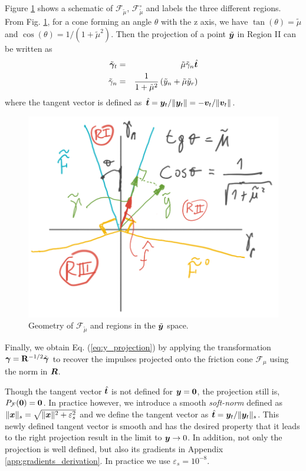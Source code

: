 Figure \ref{fig:cone_regions} shows a schematic of
$\mathcal{F}_{\tilde\mu}$, $\mathcal{F}_{\tilde\mu}^\circ$ and labels the three
different regions. From Fig. \ref{fig:cone_regions}, for a cone forming an angle
$\theta$ with the z axis, we have $\tan(\theta)=\tilde\mu$ and
$\cos(\theta)=1/(1+\tilde\mu^2)$. Then the projection of a point
$\tilde{{\bm{y}}}$ in Region II can be written as
\begin{eqnarray}
	\tilde{{\bm\gamma}}_t &=& \tilde{\mu}\tilde{\gamma}_n\hat{{\bm{t}}}\nonumber\\
	\tilde{\gamma}_n &=& \frac{1}{1+\tilde{\mu}^2}\left(\tilde{y}_n +
	\tilde{\mu}\tilde{y}_r\right)\nonumber		
\end{eqnarray}
where the tangent vector is defined as
$\hat{{\bm{t}}}={\bm{y}}_t/\Vert{\bm{y}}_t\Vert=-{\bm{v}}_t/\Vert{\bm{v}}_t\Vert$. 
\begin{figure}[!h]
    \centering
    \includegraphics[width=0.45\columnwidth]{figures/cone_regions.png}
    \caption{Geometry of $\mathcal{F}_{\tilde\mu}$ and regions in the
    $\tilde{{\bm{y}}}$ space.}
    \label{fig:cone_regions}
\end{figure}

Finally, we obtain Eq. (\ref{eq:y_projection}) by applying the transformation
${\bm\gamma}={\mathbf{R}}^{-1/2}\tilde{{\bm\gamma}}$ to recover the impulses projected onto the
friction cone ${\mathcal{F}}_{\mu}$ using the norm in ${\bm{R}}$.

Though the tangent vector $\hat{{\bm{t}}}$ is not defined for ${\bm{y}}={\bm{0}}$, the
projection still is, $P_\mathcal{F}({\bm{0}})={\bm{0}}$. In practice however, we
introduce a smooth \emph{soft-norm} defined as
$\|{\bm{x}}\|_s=\sqrt{\|{\bm{x}}\|^2+\varepsilon_s^2}$ and we define the tangent
vector as $\hat{{\bm{t}}}={\bm{y}}_t/\Vert{\bm{y}}_t\Vert_s$. This newly defined tangent vector is smooth and has the desired property that it leads to the right
projection result in the limit to ${\bm{y}}\rightarrow 0$. In addition, not only
the projection is well defined, but also its gradients in Appendix
\ref{app:gradients_derivation}. In practice we use $\varepsilon_s=10^{-8}$.

